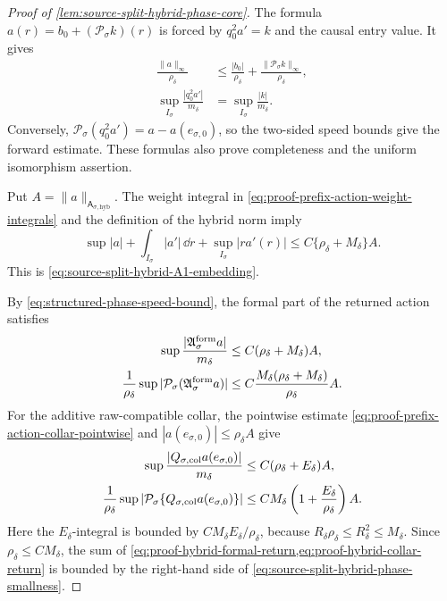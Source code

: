 \begin{proof}[Proof of
\cref{lem:source-split-hybrid-phase-core}]
The formula
\(
 a(r)=b_0+(\mathcal P_\sigma k)(r)
\)
is forced by \(q_0^2a'=k\) and the causal entry value.  It gives
\begin{align*}
 \frac{\|a\|_\infty}{\rho_\delta}
 &\le \frac{|b_0|}{\rho_\delta}
   +\frac{\|\mathcal P_\sigma k\|_\infty}{\rho_\delta},\\
 \sup_{I_\sigma}\frac{|q_0^2a'|}{m_\delta}
 &=\sup_{I_\sigma}\frac{|k|}{m_\delta}.
\end{align*}
Conversely,
\(
 \mathcal P_\sigma(q_0^2a')=a-a(e_{\sigma,0})
\), so the two-sided speed bounds give the forward estimate.  These
formulas also prove completeness and the uniform isomorphism assertion.

Put \(A=\|a\|_{\mathsf A_{\sigma,\mathrm{hyb}}}\).  The weight integral
in \cref{eq:proof-prefix-action-weight-integrals} and the definition of
the hybrid norm imply
\begin{equation}
 \sup|a|+\int_{I_\sigma}|a'|\,\dd r
       +\sup_{I_\sigma}|r a'(r)|
 \le C\{\rho_\delta+M_\delta\}A.               \label{eq:proof-hybrid-A1-embedding}
\end{equation}
This is \cref{eq:source-split-hybrid-A1-embedding}.

By \cref{eq:structured-phase-speed-bound}, the formal part of the returned
action satisfies
\begin{align}
 \sup\frac{|\mathfrak A_\sigma^{\rm form}a|}{m_\delta}
 &\le C(\rho_\delta+M_\delta)A,\notag\\
 \frac1{\rho_\delta}
  \sup|\mathcal P_\sigma(\mathfrak A_\sigma^{\rm form}a)|
 &\le C\frac{M_\delta(\rho_\delta+M_\delta)}
                 {\rho_\delta}A.                \label{eq:proof-hybrid-formal-return}
\end{align}
For the additive raw-compatible collar, the pointwise estimate
\cref{eq:proof-prefix-action-collar-pointwise} and
\(|a(e_{\sigma,0})|\le\rho_\delta A\) give
\begin{align}
 \sup\frac{|Q_{\sigma,\rm col}a(e_{\sigma,0})|}{m_\delta}
 &\le C(\rho_\delta+E_\delta)A,\notag\\
 \frac1{\rho_\delta}\sup
  |\mathcal P_\sigma\{Q_{\sigma,\rm col}a(e_{\sigma,0})\}|
 &\le CM_\delta
       \left(1+\frac{E_\delta}{\rho_\delta}\right)A.       \label{eq:proof-hybrid-collar-return}
\end{align}
Here the \(E_\delta\)-integral is bounded by
\(CM_\delta E_\delta/\rho_\delta\), because
\(R_\delta\rho_\delta\le R_\delta^2\le M_\delta\).
Since \(\rho_\delta\le C M_\delta\), the sum of
\cref{eq:proof-hybrid-formal-return,eq:proof-hybrid-collar-return} is
bounded by the right-hand side of
\cref{eq:source-split-hybrid-phase-smallness}.


\end{proof}
